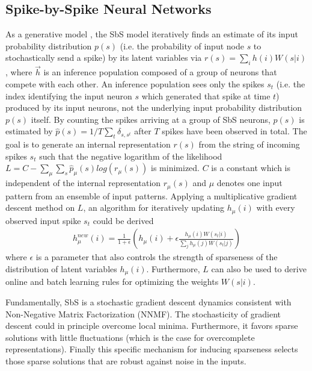 \subsection{Spike-by-Spike Neural Networks}
\label{sec:sbs}
  
  As a generative model \cite{ernst2007efficient}, the SbS model iteratively finds an estimate of its input probability distribution $p(s)$ (i.e. the probability of input node $s$ to stochastically send a spike) by its latent variables via $r(s) = \sum_i h(i) W(s|i)$, where $\vec{h}$ is an inference population composed of a group of neurons that compete with each other. An inference population sees only the spikes $s_t$ (i.e. the index identifying the input neuron $s$ which generated that spike at time $t$) produced by its input neurons, not the underlying input probability distribution $p(s)$ itself. By counting the spikes arriving at a group of SbS neurons, $p(s)$ is estimated by $\hat{p}(s) = 1/T \sum_t \delta_{s,s^t}$ after $T$ spikes have been observed in total. The goal is to generate an internal representation $r(s)$ from the string of incoming spikes $s_t$ such that the negative logarithm of the likelihood $L = C - \sum_\mu \sum_s \hat{p}_\mu(s) log\left( r_\mu(s) \right)$ is minimized. $C$ is a constant which is independent of the internal representation $r_\mu(s)$ and $\mu$ denotes one input pattern from an ensemble of input patterns. Applying a multiplicative gradient descent method on $L$, an algorithm for iteratively updating $h_\mu(i)$ with every observed input spike $s_t$ could be derived \cite{ernst2007efficient}
  \begin{eqnarray} \label{eq:sbs_update}
  h_\mu^{new}(i) = \frac{1}{1+\epsilon} \left(h_\mu(i) + \epsilon \frac{h_\mu(i) W(s_t|i) }{\sum_j h_\mu(j) W(s_t|j)} \right) 
  \end{eqnarray}
  where $\epsilon$ is a parameter that also controls the strength of sparseness of the distribution of latent variables $h_\mu(i)$. Furthermore, $L$ can also be used to derive online and batch learning rules for optimizing the weights $W(s|i)$. 


Fundamentally, SbS is a stochastic gradient descent dynamics
consistent with Non-Negative Matrix Factorization (NNMF). The stochasticity of gradient descent could
in principle overcome local minima.  Furthermore, it favors sparse
solutions with little fluctuations (which is the case for overcomplete
representations). Finally this specific mechanism for inducing
sparseness selects those sparse solutions that are robust against
noise in the inputs.

